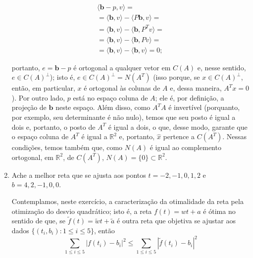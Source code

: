 \documentclass[leqno]{article}
\begin{document}
\begin{enumerate}
\begin{sol}
	\begin{equation*} 
		\begin{split} 
			\langle \mathbf{b} - p, v \rangle = \\ 
			= \langle \mathbf{b}, v \rangle - \langle P\mathbf{b}, v \rangle = \\ 
			= \langle \mathbf{b}, v \rangle - \langle \mathbf{b}, P^{T}v \rangle = \\ 
			= \langle \mathbf{b}, v \rangle - \langle \mathbf{b}, Pv \rangle = \\ 
			= \langle \mathbf{b}, v \rangle - \langle \mathbf{b}, v \rangle = 0; 
		\end{split}    
	\end{equation*} 

	\noindent portanto, $e = \mathbf{b} - p$ é ortogonal a qualquer vetor em $C(A)$ e, nesse sentido, $e \in C(A)^{\perp}$); isto é, $e \in C(A)^{\perp} = N(A^{T})$ (isso porque, se $x \in C(A)^{\perp}$, então, em particular, $x$ é ortogonal às colunas de $A$ e, dessa maneira, $A^{T}x = 0$). Por outro lado, $p$ está no espaço coluna de $A$; ele é, por definição, a projeção de $\mathbf{b}$ neste espaço. Além disso, como $A^{T}A$ é invertível (porquanto, por exemplo, seu determinante é não nulo), temos que seu posto é igual a dois e, portanto, o posto de $A^{T}$ é igual a dois, o que, desse modo, garante que o espaço coluna de $A^{T}$ é igual a $\mathbb{R}^{2}$ e, portanto, $\hat x$ pertence a $C(A^{T})$. Nessas condições, temos também que, como $N(A)$ é igual ao complemento ortogonal, em $\mathbb{R}^{2}$, de $C(A^{T})$, $N(A) = \{0\} \subset \mathbb{R}^{2}$. 

\end{sol}


\item Ache a melhor reta que se ajusta aos pontos $t = -2, -1, 0, 1, 2$ e $b = 4, 2, -1, 0, 0$.

\begin{sol}
	Contemplamos, neste exercício, a caracterização da otimalidade da reta pela otimização do desvio quadrático; isto é, a reta $f(t) = wt + a$ é ótima no sentido de que, se $\tilde f(t) = \tilde w t + \tilde a$ é outra reta que objetiva se ajustar aos dados $\{(t_{i}, b_{i}) : 1 \le i \le 5\}$, então 
	\begin{equation*} 
		\sum_{1 \le i \le 5} |f(t_{i}) - b_{i}|^{2} \le \sum_{1 \le i \le 5} |\tilde f(t_{i}) - b_{i}|^{2} 
	\end{equation*} 


\end{sol}
\end{enumerate}
\end{document}
